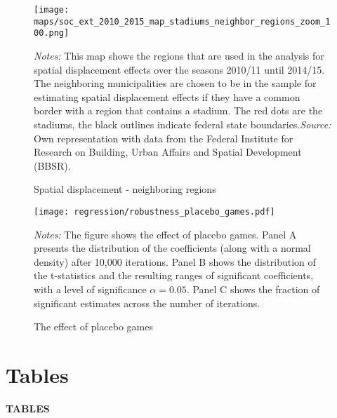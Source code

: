 \documentclass[11pt, a4paper]{article} %
\begin{document}
\vspace*{\fill}
\begin{figure}[H]\centering
	\caption{Spatial displacement - neighboring regions}\label{fig_soc_ext:map_neighboring_regions}
	\texttt{[image: maps/soc\_ext\_2010\_2015\_map\_stadiums\_neighbor\_regions\_zoom\_100.png]}
	\begin{minipage}{0.95\linewidth}
		\scriptsize{\emph{Notes:} This map shows the regions that are used in the analysis for spatial displacement effects over the seasons 2010/11 until 2014/15. The neighboring municipalities are chosen to be in the sample for estimating spatial displacement effects if they have a common border with a region that contains a stadium. The red dots are the stadiums, the black outlines indicate federal state boundaries.\newline \emph{Source:} Own representation with data from the Federal Institute for Research on Building, Urban Affairs and Spatial Development (BBSR).}
	\end{minipage}
\end{figure}
\vspace*{\fill}\clearpage
\vspace*{\fill}
\begin{figure}[H]\centering
	\caption{The effect of placebo games}\label{fig_soc_ext:robustness_placebo_games}
	\texttt{[image: regression/robustness\_placebo\_games.pdf]}
	\begin{minipage}{0.95\linewidth}
		\scriptsize{\emph{Notes:} The figure shows the effect of placebo games. Panel A presents the distribution of the coefficients (along with a normal density) after 10,000 iterations. Panel B shows the distribution of the t-statistics and the resulting ranges of significant coefficients, with a level of significance $\alpha=0.05$. Panel C shows the fraction of significant estimates across the number of iterations.}
	\end{minipage}
\end{figure}
\vspace*{\fill}\clearpage






\newpage
\TODO\section{Tables}
\vspace*{\fill}
{\Huge \begin{center}\textbf{TABLES}\end{center}}
\vspace*{\fill}\clearpage
\end{document}

